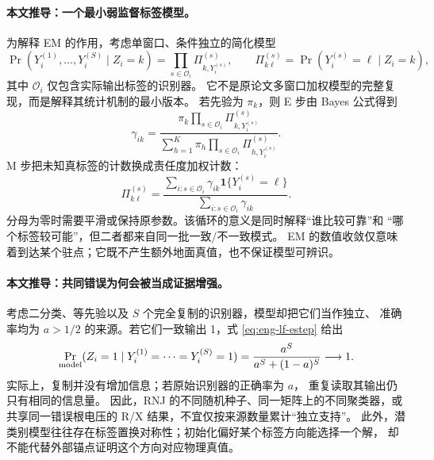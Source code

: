 \paragraph{本文推导：一个最小弱监督标签模型。}
为解释 EM 的作用，考虑单窗口、条件独立的简化模型
\begin{equation}
 \Pr(Y_i^{(1)},\ldots,Y_i^{(S)}\mid Z_i=k)
 =\prod_{s\in\mathcal O_i}\Pi^{(s)}_{k,Y_i^{(s)}},
 \qquad \Pi^{(s)}_{k\ell}=\Pr(Y_i^{(s)}=\ell\mid Z_i=k),
 \label{eq:eng-lf-model}
\end{equation}
其中 $\mathcal O_i$ 仅包含实际输出标签的识别器。
它不是原论文多窗口加权模型的完整复现，而是解释其统计机制的最小版本。
若先验为 $\pi_k$，则 E 步由 Bayes 公式得到
\begin{equation}
 \gamma_{ik}=
 \frac{\pi_k\prod_{s\in\mathcal O_i}\Pi^{(s)}_{k,Y_i^{(s)}}}
 {\sum_{h=1}^{K}\pi_h\prod_{s\in\mathcal O_i}\Pi^{(s)}_{h,Y_i^{(s)}}}.
 \label{eq:eng-lf-estep}
\end{equation}
M 步把未知真标签的计数换成责任度加权计数：
\begin{equation}
 \Pi^{(s)}_{k\ell}
 =\frac{\sum_{i:s\in\mathcal O_i}\gamma_{ik}
                 \mathbf 1\{Y_i^{(s)}=\ell\}}
        {\sum_{i:s\in\mathcal O_i}\gamma_{ik}}.
 \label{eq:eng-lf-mstep}
\end{equation}
分母为零时需要平滑或保持原参数。该循环的意义是同时解释“谁比较可靠”和
“哪个标签较可能”，但二者都来自同一批一致/不一致模式。
EM 的数值收敛仅意味着到达某个驻点；它既不产生额外地面真值，也不保证模型可辨识。

\paragraph{本文推导：共同错误为何会被当成证据增强。}
考虑二分类、等先验以及 $S$ 个完全复制的识别器，模型却把它们当作独立、
准确率均为 $a>1/2$ 的来源。若它们一致输出 1，式 \eqref{eq:eng-lf-estep} 给出
\begin{equation}
 \Pr_{\rm model}(Z_i=1\mid Y_i^{(1)}=\cdots=Y_i^{(S)}=1)
 =\frac{a^S}{a^S+(1-a)^S}\longrightarrow 1.
 \label{eq:eng-duplicate}
\end{equation}
实际上，复制并没有增加信息；若原始识别器的正确率为 $a$，
重复读取其输出仍只有相同的信息量。
因此，RNJ 的不同随机种子、同一矩阵上的不同聚类器，或共享同一错误根电压的
R/X 结果，不宜仅按来源数量累计“独立支持”。
此外，潜类别模型往往存在标签置换对称性；初始化偏好某个标签方向能选择一个解，
却不能代替外部锚点证明这个方向对应物理真值。

